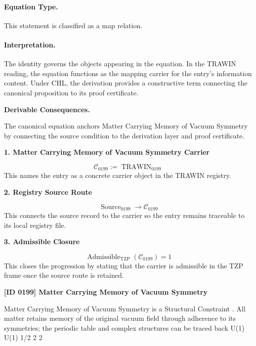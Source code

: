 \paragraph{Equation Type.}
This statement is classified as a map relation.

\paragraph{Interpretation.}
The identity governs the objects appearing in the equation. In the TRAWIN reading, the equation functions as the mapping carrier for the entry’s information content. Under CHL, the derivation provides a constructive term connecting the canonical proposition to its proof certificate.

\par\vspace{0.35em}
\noindent\textbf{Derivable Consequences.}\quad
\begingroup
\footnotesize
\raggedright
The canonical equation anchors Matter Carrying Memory of Vacuum Symmetry by connecting the source condition to the derivation layer and proof certificate.
\par\endgroup

\noindent\textbf{1. Matter Carrying Memory of Vacuum Symmetry Carrier}\par
\[
\mathcal{C}_{0199} := \operatorname{TRAWIN}_{0199}
\]
\noindent This names the entry as a concrete carrier object in the TRAWIN registry.\par
\noindent\textbf{2. Registry Source Route}\par
\[
\operatorname{Source}_{0199}\longrightarrow \mathcal{C}_{0199}
\]
\noindent This connects the source record to the carrier so the entry remains traceable to its local registry file.\par
\noindent\textbf{3. Admissible Closure}\par
\[
\operatorname{Admissible}_{\mathrm{TZP}}\!\left(\mathcal{C}_{0199}\right)=1
\]
\noindent This closes the progression by stating that the carrier is admissible in the TZP frame once the source route is retained.\par

\clearpage
\noindent\textbf{[ID 0199] Matter Carrying Memory of Vacuum Symmetry}\par
\vspace{0.35em}
\begingroup\small
{}
Matter Carrying Memory of Vacuum Symmetry is a Structural Constraint  . All matter retains memory of the original vacuum field through adherence to its symmetries; the periodic table and complex structures can be traced back U(1) U(1) 1/2 2  2 

